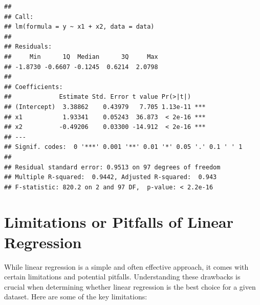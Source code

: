 \documentclass[
  12 pt,
  a4paper,
]{book}
\numberwithin{equation}{section}
\theoremstyle{plain}      %
\theoremstyle{definition} %
\theoremstyle{remark}     %
\theoremstyle{note}         %
\begin{document}
\begin{verbatim}
## 
## Call:
## lm(formula = y ~ x1 + x2, data = data)
## 
## Residuals:
##     Min      1Q  Median      3Q     Max 
## -1.8730 -0.6607 -0.1245  0.6214  2.0798 
## 
## Coefficients:
##             Estimate Std. Error t value Pr(>|t|)    
## (Intercept)  3.38862    0.43979   7.705 1.13e-11 ***
## x1           1.93341    0.05243  36.873  < 2e-16 ***
## x2          -0.49206    0.03300 -14.912  < 2e-16 ***
## ---
## Signif. codes:  0 '***' 0.001 '**' 0.01 '*' 0.05 '.' 0.1 ' ' 1
## 
## Residual standard error: 0.9513 on 97 degrees of freedom
## Multiple R-squared:  0.9442, Adjusted R-squared:  0.943 
## F-statistic: 820.2 on 2 and 97 DF,  p-value: < 2.2e-16
\end{verbatim}

\normalsize

\newpage

\hypertarget{limitations-or-pitfalls-of-linear-regression}{%
\section{Limitations or Pitfalls of Linear
Regression}\label{limitations-or-pitfalls-of-linear-regression}}

While linear regression is a simple and often effective approach, it
comes with certain limitations and potential pitfalls. Understanding
these drawbacks is crucial when determining whether linear regression is
the best choice for a given dataset. Here are some of the key
limitations:
\end{document}
